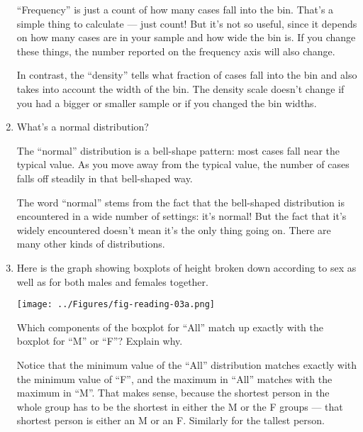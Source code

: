 \begin{enumerate}
\begin{AnswerText}
``Frequency'' is just a count of how many cases fall into the bin.
That's a simple thing to calculate --- just count!  But it's not so
useful, since it depends on how many cases are in your sample and how
wide the bin is.  If you change these things, the number reported on
the frequency axis will also change. 

In contrast, the ``density'' tells what fraction of cases fall into
the bin and also takes into account the width of the bin.  The density
scale doesn't change if you had a bigger or smaller sample or if you
changed the bin widths.
\end{AnswerText}

\item What's a normal distribution?\TextEntry[itemname=normal]

\begin{AnswerText}
The ``normal'' distribution is a bell-shape pattern: most cases fall
near the typical value.  As you move away from the typical value, the
number of cases falls off steadily in that bell-shaped way.

The word ``normal'' stems from the fact that the bell-shaped
distribution is encountered in a wide number of settings: it's normal!
But the fact that it's widely encountered doesn't mean it's the only
thing going on.  There are many other kinds of distributions.
\end{AnswerText}

\item Here is the graph showing boxplots of 
height broken down according to sex as well as 
for both males and females together. 

\bigskip
\centerline{\texttt{[image: ../Figures/fig-reading-03a.png]}}
\bigskip

Which components of the boxplot for
``All'' match up exactly with the boxplot for ``M'' or ``F''?  Explain
why.\TextEntry[itemname=boxplot]

\begin{AnswerText}
Notice that the minimum value of the ``All'' distribution matches
exactly with the minimum value of ``F'', and the maximum in ``All''
matches with the maximum in ``M''.  That makes sense, because the
shortest person in the whole group has to be the shortest in either
the M or the F groups --- that shortest person is either an M or an
F.  Similarly for the tallest person.
\end{AnswerText}


\end{enumerate}
